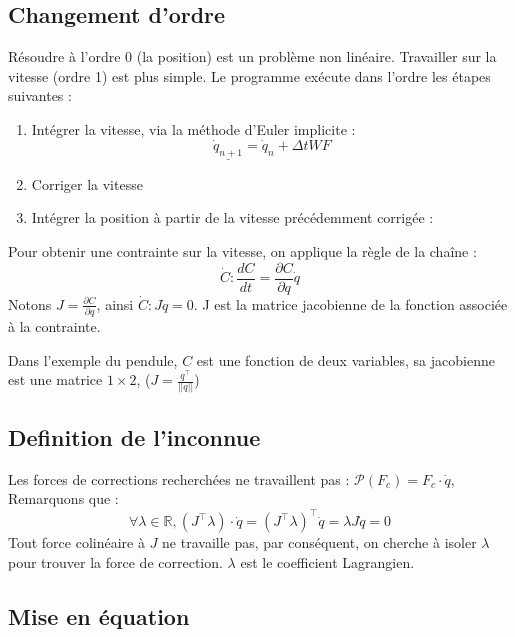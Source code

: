 \subsection{Changement d'ordre}\label{subsec:changement-d'ordre}
Résoudre à l'ordre 0 (la position) est un problème non linéaire.
Travailler sur la vitesse (ordre 1) est plus simple.
Le programme exécute dans l'ordre les étapes suivantes :
\begin{enumerate}
    \item Intégrer la vitesse, via la méthode d'Euler implicite :
    \[\underline{\dot{q}_{n + 1}} = \dot{q}_n + \Delta t WF \]
    \item Corriger la vitesse
    \item Intégrer la position à partir de la vitesse précédemment corrigée :
\end{enumerate}


Pour obtenir une contrainte sur la vitesse, on applique la règle de la chaîne :
\[\dot{C} : \frac{dC}{dt} = \frac{\partial C}{\partial q} \dot{q}\]
Notons $J = \frac{\partial C}{\partial q}$, ainsi $\dot{C} : J\dot{q} = 0$.
J est la matrice jacobienne de la fonction associée à la contrainte.

Dans l'exemple du pendule, $C$ est une fonction de deux variables, sa jacobienne est une matrice $1 \times 2$, ($J = \frac{q^\intercal}{||q||}$)

\subsection{Definition de l'inconnue}\label{subsec:definition-l'inconnue}
Les forces de corrections recherchées ne travaillent pas : $\mathcal{P}(F_c) = F_c \cdot \dot{q}$, Remarquons que :
\[\forall \lambda \in \mathbb{R}, \left(J^\intercal \lambda\right) \cdot \dot{q} = (J^\intercal \lambda)^\intercal \dot{q} = \lambda J \dot{q} = 0\]
Tout force colinéaire à $J$ ne travaille pas, par conséquent, on cherche à isoler $\lambda$ pour trouver la force de correction.
$\lambda$ est le coefficient Lagrangien.

\subsection{Mise en équation}\label{subsec:mise-en-equation}

